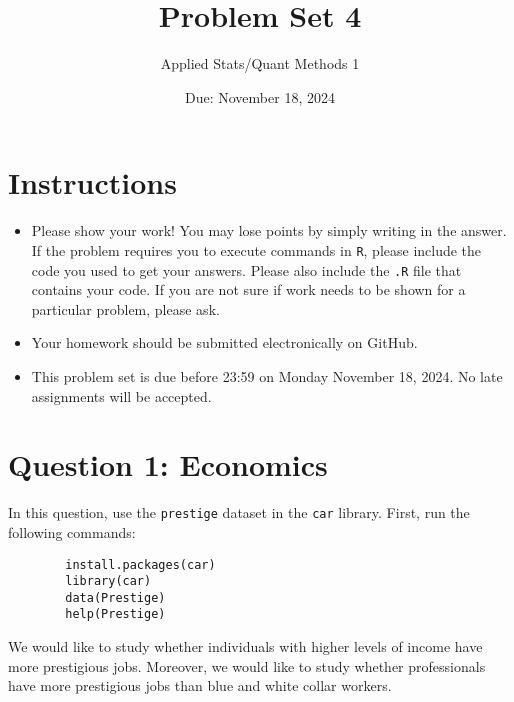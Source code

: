 \documentclass[12pt,letterpaper]{article}
\title{Problem Set 4}
\date{Due: November 18, 2024}
\author{Applied Stats/Quant Methods 1}
\begin{document}
	\maketitle
	\section*{Instructions}
	\begin{itemize}
		\item Please show your work! You may lose points by simply writing in the answer. If the problem requires you to execute commands in \texttt{R}, please include the code you used to get your answers. Please also include the \texttt{.R} file that contains your code. If you are not sure if work needs to be shown for a particular problem, please ask.
		\item Your homework should be submitted electronically on GitHub.
		\item This problem set is due before 23:59 on Monday November 18, 2024. No late assignments will be accepted.
	\end{itemize}
	
	
	
	\vspace{.5cm}
	\section*{Question 1: Economics}
	\vspace{.25cm}
	\noindent 	
	In this question, use the \texttt{prestige} dataset in the \texttt{car} library. First, run the following commands:
	
	\begin{verbatim}
		install.packages(car)
		library(car)
		data(Prestige)
		help(Prestige)
	\end{verbatim} 
	
	
	\noindent We would like to study whether individuals with higher levels of income have more prestigious jobs. Moreover, we would like to study whether professionals have more prestigious jobs than blue and white collar workers.
	
\end{document}

